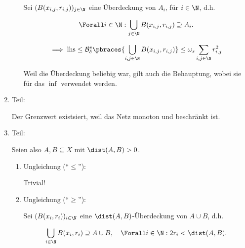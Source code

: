 \begin{solution}
\begin{enumerate}[label = \arabic*.]
\begin{enumerate}[label = \arabic*.]
        Sei $(B(x_{i, j}, r_{i, j}))_{j \in \N}$ eine Überdeckung von $A_i$, für $i \in \N$, d.h.

        \begin{align*}
            \Forall i \in \N:
                \bigcup_{j \in \N}
                    B(x_{i, j}, r_{i, j})
                \supseteq
                A_i.
        \end{align*}

        \begin{align*}
            \implies
            \mathrm{lhs}
            \leq
            \mathcal{B}_\delta^s
            \pbraces
            {
                \bigcup_{i, j \in \N}
                    B(x_{i, j}, r_{i, j})
            }
            \leq
            \omega_s
            \sum_{i, j \in \N}
                r_{i, j}^2
        \end{align*}

        Weil die Überdeckung beliebig war, gilt auch die Behauptung, wobei sie für das $\inf$ verwendet werden.

    \end{enumerate}

    \item Teil:
    
    Der Grenzwert existsiert, weil das Netz monoton und beschränkt ist.

    \item Teil:
    

    Seien also $A, B \subseteq X$ mit $\dist(A, B) > 0$.

    \begin{enumerate}

        \item Ungleichung (\enquote{$\leq$}):
        
        Trivial!

        \item Ungleichung (\enquote{$\geq$}):

        Sei $(B(x_i, r_i))_{i \in \N}$ eine $\dist(A, B)$-Überdeckung von $A \cup B$, d.h.

        \begin{align*}
            \bigcup_{i \in \N}
                B(x_i, r_i)
            \supseteq
            A \cup B,
            \quad
            \Forall i \in \N:
                2 r_i < \dist(A, B).
        \end{align*}


\end{enumerate}
\end{enumerate}
\end{solution}
